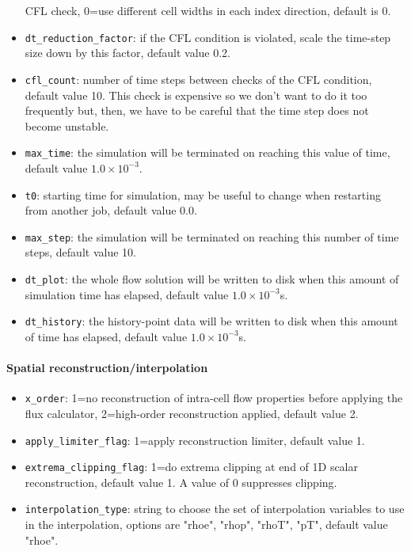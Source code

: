 \begin{itemize}
  CFL check, 0=use different cell widths in each index direction, default is 0.
\item \texttt{dt\_reduction\_factor}\ddag: if the CFL condition is violated, scale the time-step size
  down by this factor, default value 0.2.
\item \texttt{cfl\_count}: number of time steps between checks of the CFL
  condition, default value 10.
  This check is expensive so we don't want to do it too frequently but, then,
  we have to be careful that the time step does not become unstable.
\item \texttt{max\_time}\ddag: the simulation will be terminated on reaching this
  value of time, default value $1.0 \times 10^{-3}$.
\item \texttt{t0}: starting time for simulation, may be useful to change when restarting from another job,
  default value 0.0.
\item \texttt{max\_step}\ddag: the simulation will be terminated on reaching this
  number of time steps, default value 10.
\item \texttt{dt\_plot}\ddag: the whole flow solution will be written to disk when
  this amount of simulation time has elapsed, default value $1.0 \times 10^{-3}$s.
\item \texttt{dt\_history}\ddag: the history-point data will be written to disk
  when this amount of time has elapsed, default value $1.0 \times 10^{-3}$s.
\end{itemize}

\paragraph{Spatial reconstruction/interpolation}
\begin{itemize}
\item \texttt{x\_order}\ddag: 1=no reconstruction of intra-cell flow properties
  before applying the flux calculator, 2=high-order reconstruction applied, 
  default value 2.
\item \texttt{apply\_limiter\_flag}: 1=apply reconstruction limiter, default value 1.
\item \texttt{extrema\_clipping\_flag}: 1=do extrema clipping at end of 1D scalar reconstruction,
  default value 1.  A value of 0 suppresses clipping.
\item \texttt{interpolation\_type}: string to choose the set of interpolation variables
  to use in the interpolation, options are "rhoe", "rhop", "rhoT", "pT", default value "rhoe".
\end{itemize}


